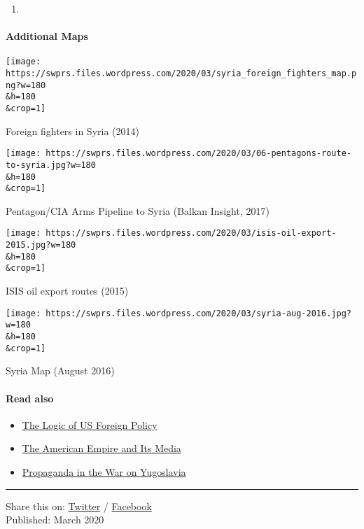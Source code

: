 \begin{enumerate}
\def\labelenumi{\arabic{enumi})}
\setcounter{enumi}{2018}
\item
\end{enumerate}

\hypertarget{additional-maps}{%
\paragraph{Additional Maps}\label{additional-maps}}

\texttt{[image: https://swprs.files.wordpress.com/2020/03/syria\_foreign\_fighters\_map.png?w=180\\\&h=180\\\&crop=1]}

Foreign fighters in Syria (2014)

\texttt{[image: https://swprs.files.wordpress.com/2020/03/06-pentagons-route-to-syria.jpg?w=180\\\&h=180\\\&crop=1]}

Pentagon/CIA Arms Pipeline to Syria (Balkan Insight, 2017)

\texttt{[image: https://swprs.files.wordpress.com/2020/03/isis-oil-export-2015.jpg?w=180\\\&h=180\\\&crop=1]}

ISIS oil export routes (2015)

\texttt{[image: https://swprs.files.wordpress.com/2020/03/syria-aug-2016.jpg?w=180\\\&h=180\\\&crop=1]}

Syria Map (August 2016)

\hypertarget{read-also}{%
\paragraph{Read also}\label{read-also}}

\begin{itemize}
\tightlist
\item
  \href{https://swprs.org/us-foreign-policy/}{The Logic of US Foreign
  Policy}
\item
  \href{https://swprs.org/the-american-empire-and-its-media/}{The
  American Empire and Its Media}
\item
  \href{https://swprs.org/propaganda-in-the-war-on-yugoslavia/}{Propaganda
  in the War on Yugoslavia}
\end{itemize}

\begin{center}\rule{0.5\linewidth}{\linethickness}\end{center}

Share this on:
\href{https://twitter.com/intent/tweet?url=https://swprs.org/the-syria-deception/}{Twitter}
/
\href{https://www.facebook.com/share.php?u=https://swprs.org/the-syria-deception/}{Facebook}\\
Published: March 2020

